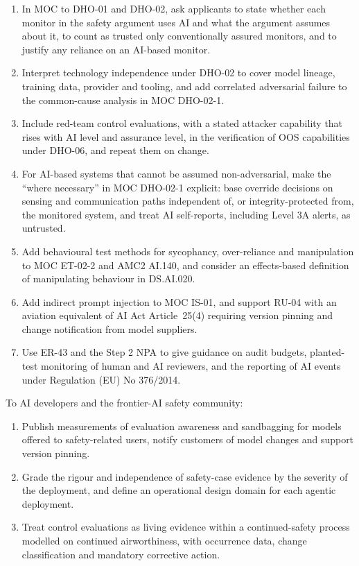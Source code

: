 \documentclass[11pt]{article}
\begin{document}
\begin{enumerate}
\item In MOC to DHO-01 and DHO-02, ask applicants to state whether each monitor in the safety argument uses AI and what the argument assumes about it, to count as trusted only conventionally assured monitors, and to justify any reliance on an AI-based monitor.
\item Interpret technology independence under DHO-02 to cover model lineage, training data, provider and tooling, and add correlated adversarial failure to the common-cause analysis in MOC DHO-02-1.
\item Include red-team control evaluations, with a stated attacker capability that rises with AI level and assurance level, in the verification of OOS capabilities under DHO-06, and repeat them on change.
\item For AI-based systems that cannot be assumed non-adversarial, make the ``where necessary'' in MOC DHO-02-1 explicit: base override decisions on sensing and communication paths independent of, or integrity-protected from, the monitored system, and treat AI self-reports, including Level 3A alerts, as untrusted.
\item Add behavioural test methods for sycophancy, over-reliance and manipulation to MOC ET-02-2 and AMC2 AI.140, and consider an effects-based definition of manipulating behaviour in DS.AI.020.
\item Add indirect prompt injection to MOC IS-01, and support RU-04 with an aviation equivalent of AI Act Article~25(4) requiring version pinning and change notification from model suppliers.
\item Use ER-43 and the Step 2 NPA to give guidance on audit budgets, planted-test monitoring of human and AI reviewers, and the reporting of AI events under Regulation (EU) No 376/2014.
\end{enumerate}

To AI developers and the frontier-AI safety community:

\begin{enumerate}[resume]
\item Publish measurements of evaluation awareness and sandbagging for models offered to safety-related users, notify customers of model changes and support version pinning.
\item Grade the rigour and independence of safety-case evidence by the severity of the deployment, and define an operational design domain for each agentic deployment.
\item Treat control evaluations as living evidence within a continued-safety process modelled on continued airworthiness, with occurrence data, change classification and mandatory corrective action.
\end{enumerate}
\end{document}
